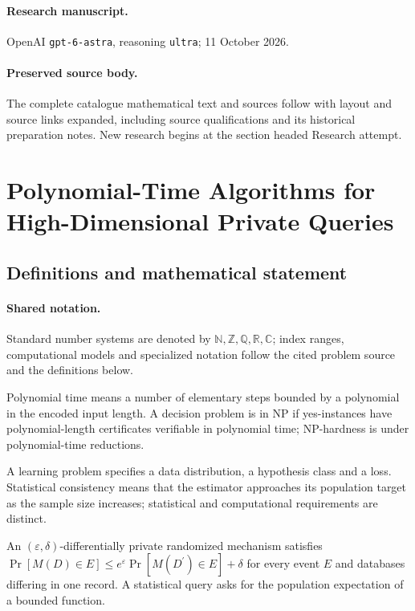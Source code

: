 \documentclass[11pt]{article}
\begin{document}
\paragraph{Research manuscript.} OpenAI \texttt{gpt-6-astra}, reasoning \texttt{ultra}; 11 October 2026.
\paragraph{Preserved source body.} The complete catalogue mathematical text and sources follow with layout and source links expanded, including source qualifications and its historical preparation notes. New research begins at the section headed Research attempt.

\section{Polynomial-Time Algorithms for High-Dimensional Private Queries}\label{statement}

\subsection{Definitions and mathematical statement}

\paragraph{Shared notation.}Standard number systems are denoted by $\mathbb N,\mathbb Z,\mathbb Q,\mathbb R,\mathbb C$; index ranges, computational models and specialized notation follow the cited problem source and the definitions below.


Polynomial time means a number of elementary steps bounded by a polynomial in the encoded input length. A decision problem is in $\mathrm{NP}$ if yes-instances have polynomial-length certificates verifiable in polynomial time; NP-hardness is under polynomial-time reductions.

A learning problem specifies a data distribution, a hypothesis class and a loss. Statistical consistency means that the estimator approaches its population target as the sample size increases; statistical and computational requirements are distinct.

An $(\varepsilon,\delta)$-differentially private randomized mechanism satisfies $\Pr[M(D)\in E]\leq e^\varepsilon\Pr[M(D^{\prime})\in E]+\delta$ for every event $E$ and databases differing in one record. A statistical query asks for the population expectation of a bounded function.
\end{document}
